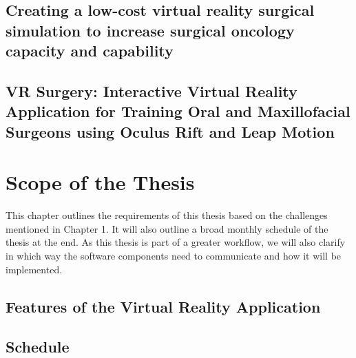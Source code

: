 \documentclass[twoside, parskip]{VRThesis} %
\begin{document}
\section{\label{sec::RelatedWork1}Creating a low-cost virtual reality surgical simulation to increase surgical oncology capacity and capability}


\section{\label{sec::RelatedWork2}VR Surgery: Interactive Virtual Reality Application for Training Oral and Maxillofacial Surgeons using Oculus Rift and Leap Motion}


\chapter{Scope of the Thesis}

This chapter outlines the requirements of this thesis based on the challenges mentioned in Chapter 1.
It will also outline a broad monthly schedule of the thesis at the end.
As this thesis is part of a greater workflow, we will also clarify in which way the software components need to communicate and how it will be implemented.

\section{\label{sec::Features}Features of the Virtual Reality Application}


\section{Schedule}


 

%
\end{document}
